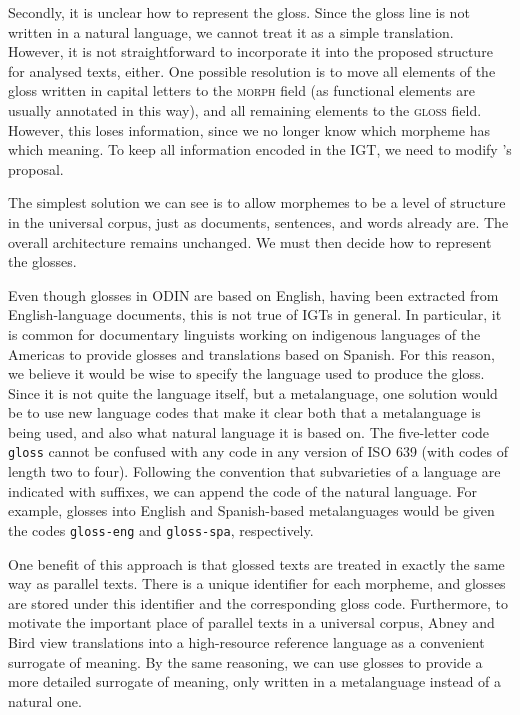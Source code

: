 Secondly, it is unclear how to represent the gloss.  Since the gloss line is not written in a natural language, we cannot treat it as a simple translation.  However, it is not straightforward to incorporate it into the proposed structure for analysed texts, either.  
One possible resolution is to move all elements of the gloss written in capital letters to the \textsc{morph} field (as functional elements are usually annotated in this way), and all remaining elements to the \textsc{gloss} field.  However, this loses information, since we no longer know which morpheme has which meaning.  To keep all information encoded in the IGT, we need to modify 's proposal.

The simplest solution we can see is to allow morphemes to be a level of structure in the universal corpus, just as documents, sentences, and words already are.  The overall architecture remains unchanged.  We must then decide how to represent the glosses.

Even though glosses in ODIN are based on English, having been extracted from English-language documents, this is not true of IGTs in general.  In particular, it is common for documentary linguists working on indigenous languages of the Americas to provide glosses and translations based on Spanish.  For this reason, we believe it would be wise to specify the language used to produce the gloss.  Since it is not quite the language itself, but a metalanguage, one solution
would be to use new language codes that make it clear both that a metalanguage is being used, and also what natural language it is based on.  The five-letter code \texttt{gloss} cannot be confused with any code in any version of ISO 639 (with codes of length two to four).  Following the convention that subvarieties of a language are indicated with suffixes, we can append the code of the natural language.  For example, glosses into English and Spanish-based metalanguages would be given the codes \texttt{gloss-eng} and \texttt{gloss-spa}, respectively.

One benefit of this approach is that glossed texts are treated in exactly the same way as parallel texts.  There is a unique identifier for each morpheme, and glosses are stored under this identifier and the corresponding gloss code.  Furthermore, to motivate the important place of parallel texts in a universal corpus, Abney and Bird view translations into a high-resource reference language as a convenient surrogate of meaning. By the same reasoning, we can use glosses to provide a more detailed surrogate of meaning, only written in a metalanguage instead of a natural one.



